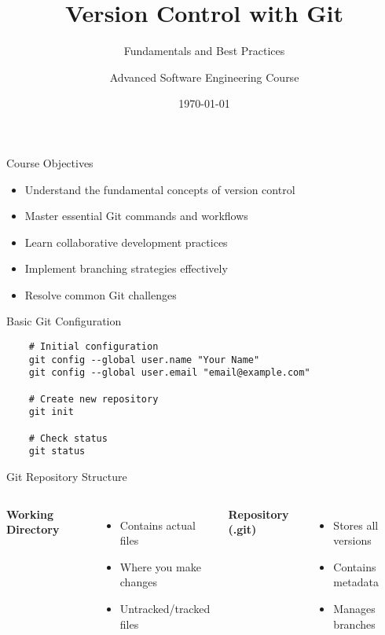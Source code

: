 \documentclass[10pt]{beamer}
\title{Version Control with Git}
\subtitle{Fundamentals and Best Practices}
\author{Advanced Software Engineering Course}
\date{\today}
\begin{document}
\begin{frame}
    \titlepage
\end{frame}

\begin{frame}{Course Objectives}
    \begin{itemize}
        \item Understand the fundamental concepts of version control
        \item Master essential Git commands and workflows
        \item Learn collaborative development practices
        \item Implement branching strategies effectively
        \item Resolve common Git challenges
    \end{itemize}
\end{frame}

\begin{frame}[fragile]{Basic Git Configuration}
    \begin{verbatim}
    # Initial configuration
    git config --global user.name "Your Name"
    git config --global user.email "email@example.com"
    
    # Create new repository
    git init
    
    # Check status
    git status
    \end{verbatim}
\end{frame}

\begin{frame}{Git Repository Structure}
    \begin{columns}
        \textbf{Working Directory}
        \begin{itemize}
            \item Contains actual files
            \item Where you make changes
            \item Untracked/tracked files
        \end{itemize}
        
        \textbf{Repository (.git)}
        \begin{itemize}
            \item Stores all versions
            \item Contains metadata
            \item Manages branches
        \end{itemize}
    \end{columns}
\end{frame}
\end{document}
